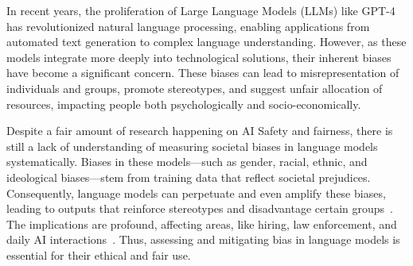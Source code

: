

In recent years, the proliferation of Large Language Models (LLMs) like GPT-4 has revolutionized natural language processing, enabling applications from automated text generation to complex language understanding. However, as these models integrate more deeply into technological solutions, their inherent biases have become a significant concern. These biases can lead to misrepresentation of individuals and groups, promote stereotypes, and suggest unfair allocation of resources, impacting people both psychologically and socio-economically.



Despite a fair amount of research happening on AI Safety and fairness, there is still a lack of understanding of measuring societal biases in language models systematically. Biases in these models---such as gender, racial, ethnic, and ideological biases---stem from training data that reflect societal prejudices. Consequently, language models can perpetuate and even amplify these biases, leading to outputs that reinforce stereotypes and disadvantage certain groups~\cite{10.1145/3442188.3445922}. The implications are profound, affecting areas, like hiring, law enforcement, and daily AI interactions~\cite{schwartz2022towards, ferrara2023fairness}. Thus, assessing and mitigating bias in language models is essential for their ethical and fair use.


